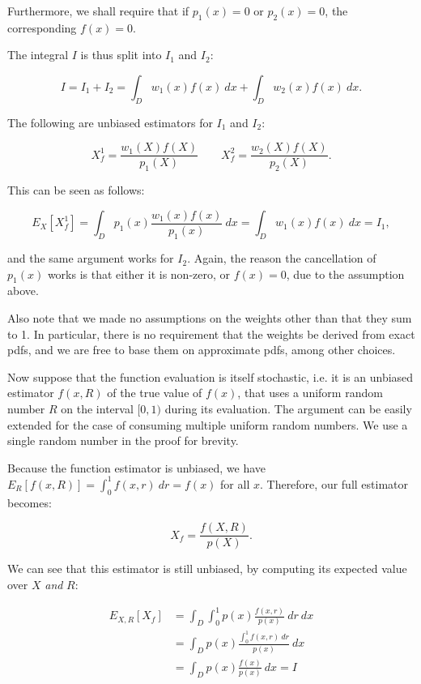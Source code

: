 Furthermore, we shall require that if $p_1(x) = 0$ or $p_2(x) = 0$, the corresponding $f(x) = 0$.

The integral $I$ is thus split into $I_1$ and $I_2$:

\begin{equation}
I = I_1 + I_2 = \int_D w_1(x) f(x) \ dx + \int_D w_2(x) f(x) \ dx.
\end{equation}

The following are unbiased estimators for $I_1$ and $I_2$:

\begin{equation}
X_f^1 = \frac{w_1(X)f(X)}{p_1(X)} \qquad X_f^2 = \frac{w_2(X)f(X)}{p_2(X)}.
\end{equation}

This can be seen as follows:

\begin{equation}
E_X[X_f^1] = \int_D p_1(x) \frac{w_1(x)f(x)}{p_1(x)} \ dx = \int_D w_1(x) f(x) \ dx = I_1,
\end{equation}

and the same argument works for $I_2$. Again, the reason the cancellation of $p_1(x)$ works is that either it is non-zero, or $f(x) = 0$, due to the assumption above.

Also note that we made no assumptions on the weights other than that they sum to 1. In particular, there is no requirement that the weights be derived from exact pdfs, and we are free to base them on approximate pdfs, among other choices.



Now suppose that the function evaluation is itself stochastic, i.e. it is an unbiased estimator $f(x,R)$ of the true value of $f(x)$, that uses a uniform random number $R$ on the interval $[0,1)$ during its evaluation. The argument can be easily extended for the case of consuming multiple uniform random numbers. We use a single random number in the proof for brevity.

Because the function estimator is unbiased, we have $E_R[f(x,R)] = \int_0^1 f(x,r) \ dr = f(x)$ for all $x$. Therefore, our full estimator becomes:

\begin{equation}
X_f = \frac{f(X,R)}{p(X)}.
\end{equation}

We can see that this estimator is still unbiased, by computing its expected value over $X$ \emph{and} $R$:

\begin{align}
E_{X,R}[X_f] &= \int_D \int_0^1 p(x) \frac{f(x,r)}{p(x)} \ dr \ dx \nonumber \\
			 &= \int_D p(x) \frac{\int_0^1 f(x,r) \ dr}{p(x)} \ dx \nonumber \\
			 &= \int_D p(x) \frac{f(x)}{p(x)} \ dx = I
\end{align}




